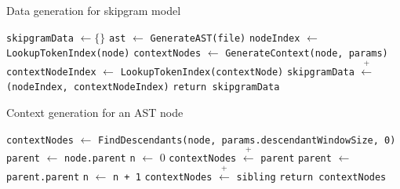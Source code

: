 \begin{algorithm}
  \caption{\label{alg:generate-skipgram}Data generation for skipgram model}
  \begin{algorithmic}[1]
      \State \lstinline{skipgramData} $\gets \{\}$
        \State \lstinline{ast} $\gets$ \lstinline{GenerateAST(file)}
          \State \lstinline{nodeIndex} $\gets$ \lstinline{LookupTokenIndex(node)}
          \State \lstinline{contextNodes} $\gets$
          \lstinline{GenerateContext(node, params)}
            \State \lstinline{contextNodeIndex} $\gets$
            \lstinline{LookupTokenIndex(contextNode)}
            \State \lstinline{skipgramData} $\overset{+}{\leftarrow}$ \lstinline{(nodeIndex, contextNodeIndex)}
          \EndFor%
        \EndFor%
      \EndFor%
      \State \lstinline{return skipgramData}
    \EndFunction%
  \end{algorithmic}
\end{algorithm}
%
\begin{algorithm}
  \caption{\label{alg:generate-context}Context generation for an AST node}
  \begin{algorithmic}[1]
      \State \lstinline{contextNodes} $\gets$ \lstinline{FindDescendants(node, params.descendantWindowSize, 0)}
      \State \lstinline{parent} $\gets$ \lstinline{node.parent}
      \State \lstinline{n} $\gets$ 0
        \State \lstinline{contextNodes} $\overset{+}{\leftarrow}$ \lstinline{parent}
        \State \lstinline{parent} $\gets$ \lstinline{parent.parent}
        \State \lstinline{n} $\gets$ \lstinline{n + 1}
      \EndWhile
          \State \lstinline{contextNodes} $\overset{+}{\leftarrow}$ \lstinline{sibling}
        \EndFor
      \EndIf
      \State \lstinline{return contextNodes}
    \EndFunction%
  \end{algorithmic}
\end{algorithm}
%
